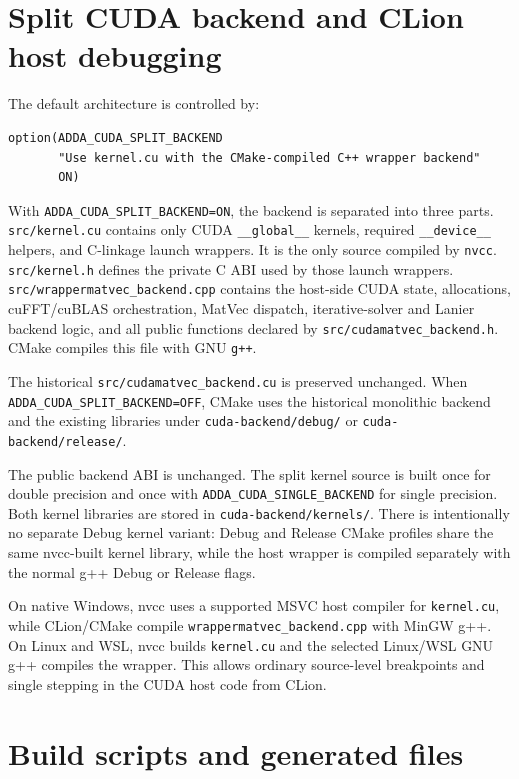 \documentclass[11pt,a4paper]{article}
\newcommand{\code}[1]{\nolinkurl{#1}}
\begin{document}
\section{Split CUDA backend and CLion host debugging}

The default architecture is controlled by:

\begin{lstlisting}
option(ADDA_CUDA_SPLIT_BACKEND
       "Use kernel.cu with the CMake-compiled C++ wrapper backend"
       ON)
\end{lstlisting}

With \code{ADDA_CUDA_SPLIT_BACKEND=ON}, the backend is separated into three
parts. \code{src/kernel.cu} contains only CUDA \code{__global__} kernels,
required \code{__device__} helpers, and C-linkage launch wrappers. It is the
only source compiled by \code{nvcc}. \code{src/kernel.h} defines the private
C ABI used by those launch wrappers. \code{src/wrappermatvec_backend.cpp}
contains the host-side CUDA state, allocations, cuFFT/cuBLAS orchestration,
MatVec dispatch, iterative-solver and Lanier backend logic, and all public
functions declared by \code{src/cudamatvec_backend.h}. CMake compiles this file
with GNU \code{g++}.

The historical \code{src/cudamatvec_backend.cu} is preserved unchanged. When
\code{ADDA_CUDA_SPLIT_BACKEND=OFF}, CMake uses the historical monolithic
backend and the existing libraries under \code{cuda-backend/debug/} or
\code{cuda-backend/release/}.

The public backend ABI is unchanged. The split kernel source is built once for
double precision and once with \code{ADDA_CUDA_SINGLE_BACKEND} for single
precision. Both kernel libraries are stored in \code{cuda-backend/kernels/}.
There is intentionally no separate Debug kernel variant: Debug and Release
CMake profiles share the same nvcc-built kernel library, while the host wrapper
is compiled separately with the normal g++ Debug or Release flags.

On native Windows, nvcc uses a supported MSVC host compiler for
\code{kernel.cu}, while CLion/CMake compile \code{wrappermatvec_backend.cpp}
with MinGW g++. On Linux and WSL, nvcc builds \code{kernel.cu} and the selected
Linux/WSL GNU g++ compiles the wrapper. This allows ordinary source-level
breakpoints and single stepping in the CUDA host code from CLion.

\section{Build scripts and generated files}
\end{document}

